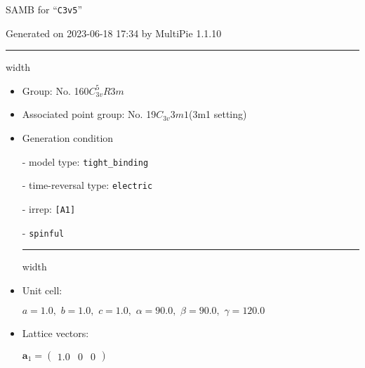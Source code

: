 \documentclass[fleqn,10pt,landscape]{article}
\begin{document}
\setcounter{MaxMatrixCols}{16}

\setlength{\baselineskip}{16pt}
\footnotesize
\begin{center}
\LARGE
SAMB for ``\texttt{C3v5}''
\end{center}
\begin{flushright}
Generated on 2023-06-18 17:34 by MultiPie 1.1.10
\end{flushright}
\vspace{1cm}


 \hfil \hrule height 1mm width \textwidth \hfil

\begin{itemize}
\item Group: No. 160\quad$C_{3v}^{5}$\quad$R3m$\quad[ trigonal ]

\item Associated point group: No. 19\quad$C_{3v}$\quad$3m1$\quad(3m1 setting)\quad[ trigonal ]

\vspace{5mm}

\item Generation condition

\quad - model type: \texttt{tight_binding}

\quad - time-reversal type: \texttt{electric}

\quad - irrep: \texttt{[A1]}

\quad - \texttt{spinful}


 \hfil \hrule height 1mm width \textwidth \hfil

\item Unit cell:

\quad $a=1.0,\,\, b=1.0,\,\, c=1.0,\,\, \alpha=90.0,\,\, \beta=90.0,\,\, \gamma=120.0$

\item Lattice vectors:

\quad $\bm{a}_1=\begin{pmatrix} 1.0 & 0 & 0 \end{pmatrix}$


\end{itemize}
\end{document}
